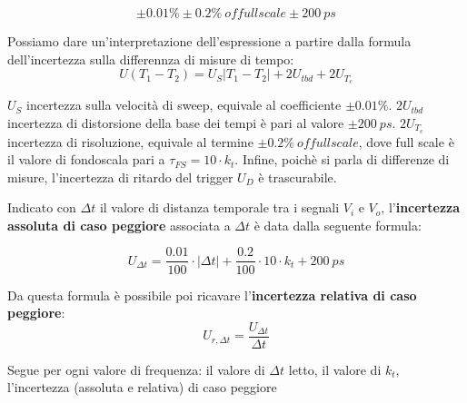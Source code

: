 \[\pm0.01\% \pm0.2\% \ of full scale \pm 200 \ ps\]

Possiamo dare un'interpretazione dell'espressione a partire dalla formula dell'incertezza sulla differennza di misure di tempo:
\[U(T_1 - T_2) = U_S |T_1 - T_2| + 2U_{tbd} + 2U_{T_c}\]

$U_S$ incertezza sulla velocità di sweep, equivale al coefficiente $\pm0.01\%$.
$2U_{tbd}$ incertezza di distorsione della base dei tempi è pari al valore $\pm200 \ ps$.
$2U_{T_c}$ incertezza di risoluzione, equivale al termine $\pm0.2\% \ of full scale$, dove full scale è il valore di fondoscala pari a $\tau _{FS}  = 10 \cdot k_t$.
Infine, poichè si parla di differenze di misure, l'incertezza di ritardo del trigger $U_D$ è trascurabile.

Indicato con $\Delta t$ il valore di distanza temporale tra i segnali $V_i$ e $V_o$, l'\textbf{incertezza assoluta di caso peggiore} associata a $\Delta t$ è data dalla seguente formula:

\[U_{\Delta t} = \frac{0.01}{100} \cdot |\Delta t| + \frac{0.2}{100} \cdot  10 \cdot k_t + 200 \ ps  \]

Da questa formula è possibile poi ricavare l'\textbf{incertezza relativa di caso peggiore}:
\[U_{r,\Delta t} = \frac{U_{\Delta t}}{\Delta t}\]

Segue per ogni valore di frequenza: il valore di $\Delta t$ letto, il valore di $k_t$, l'incertezza (assoluta e relativa) di caso peggiore

